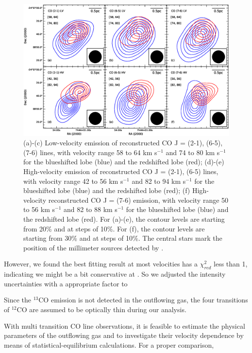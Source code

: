 
\begin{figure}
\includegraphics[scale=.6]{./fig/cvl_contour.eps}
\caption{(a)-(c) Low-velocity emission of reconstructed CO J = (2-1), (6-5), (7-6) lines, with velocity range 58 to 64 km s$^{-1} $ and 74 to 80 km s$^{-1}$ for the blueshifted lobe (blue) and the redshifted lobe (red); (d)-(e) High-velocity emission of reconstructed CO J = (2-1), (6-5) lines, with velocity range 42 to 56 km s$^{-1} $ and 82 to 94 km s$^{-1}$ for the blueshifted lobe (blue) and  the redshifted lobe (red); (f) High-velocity reconstructed CO J = (7-6) emission, with velocity range 50 to 56 km s$^{-1} $ and 82 to 88 km s$^{-1}$ for the blueshifted lobe (blue) and  the redshifted lobe (red). For (a)-(e), the contour levels are starting from 20\% and at steps of 10\%. For (f), the contour levels are starting from 30\% and at steps of 10\%. The central stars mark the position of the millimeter sources detected by \citet{2009ApJ...696...66Q}.  \label{fig2}}
\end{figure}



However, we found the best fitting result at most velocities has a $\chi^2_{red}$ less than 1, indicating we might be a bit conservative at . So we adjusted the intensity uncertainties with a appropriate factor to 



Since the $^{13}$CO emission is not detected in the outflowing gas, the four transitions of $^{12}$CO are assumed to be 
optically thin during our analysis. 



With multi transition CO line observations, it is feasible to estimate the physical parameters of the outflowing gas and to investigate their velocity dependence by means of statistical-equilibrium calculations. For a proper comparison, 

